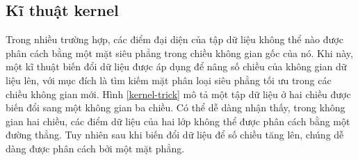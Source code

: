 \subsection*{Kĩ thuật kernel}
Trong nhiều trường hợp, các điểm đại diện của tập dữ liệu không thể nào được phân cách bằng một mặt siêu phẳng trong chiều không gian gốc của nó. Khi này, một kĩ thuật biến đổi dữ liệu được áp dụng để nâng số chiều của không gian dữ liệu lên, với mục đích là tìm kiếm mặt phân loại siêu phẳng tối ưu trong các chiều không gian mới. Hình \ref{kernel-trick} mô tả một tập dữ liệu ở hai chiều được biến đổi sang một không gian ba chiều. Có thể dễ dàng nhận thấy, trong không gian hai chiều, các điểm dữ liệu của hai lớp không thể được phân cách bằng một đường thẳng. Tuy nhiên sau khi biến đổi dữ liệu để số chiều tăng lên, chúng dễ dàng được phân cách bởi một mặt phẳng.

